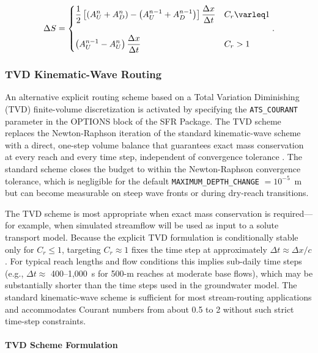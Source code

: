 \begin{equation}
	\label{eqn:sfr-mf6-storage}
	\Delta S =
	\begin{dcases}
		\dfrac{1}{2}\left[\left(A_U^n + A_D^n\right) - \left(A_U^{n-1} + A_D^{n-1}\right)\right] \dfrac{\Delta x}{\Delta t}
		& C_r \le 1 \\[10pt]
		\left(A_U^{n-1} - A_U^n\right) \dfrac{\Delta x}{\Delta t}
		& C_r > 1
	\end{dcases} .
\end{equation}

\subsubsection{TVD Kinematic-Wave Routing}
\label{sec:sfr-tvd}

An alternative explicit routing scheme based on a Total Variation Diminishing (TVD) finite-volume discretization is activated by specifying the \texttt{ATS\_COURANT} parameter in the OPTIONS block of the SFR Package. The TVD scheme replaces the Newton-Raphson iteration of the standard kinematic-wave scheme with a direct, one-step volume balance that guarantees exact mass conservation at every reach and every time step, independent of convergence tolerance \citep{Harten1983, LeVeque2002}. The standard scheme closes the budget to within the Newton-Raphson convergence tolerance, which is negligible for the default \texttt{MAXIMUM\_DEPTH\_CHANGE} $= 10^{-5}$~m but can become measurable on steep wave fronts or during dry-reach transitions.

The TVD scheme is most appropriate when exact mass conservation is required---for example, when simulated streamflow will be used as input to a solute transport model. Because the explicit TVD formulation is conditionally stable only for $C_r \le 1$, targeting $C_r \approx 1$ fixes the time step at approximately $\Delta t \approx \Delta x / c$. For typical reach lengths and flow conditions this implies sub-daily time steps (e.g., $\Delta t \approx$ 400--1,000~s for 500-m reaches at moderate base flows), which may be substantially shorter than the time steps used in the groundwater model. The standard kinematic-wave scheme is sufficient for most stream-routing applications and accommodates Courant numbers from about 0.5 to 2 without such strict time-step constraints.

\paragraph{TVD Scheme Formulation}

